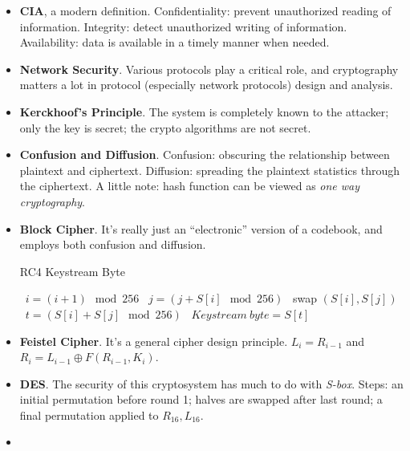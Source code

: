 \documentclass[twocolumn]{article}
\begin{document}
\begin{itemize}
\item \textbf{CIA}, a modern definition. Confidentiality: prevent
  unauthorized reading of information. Integrity: detect unauthorized
  writing of information. Availability: data is available in a timely
  manner when needed. 
\item \textbf{Network Security}. Various protocols play a critical
  role, and cryptography matters a lot in protocol (especially network
  protocols) design and analysis.
\item \textbf{Kerckhoof's Principle}. The system is completely known
  to the attacker; only the key is secret; the crypto algorithms are
  not secret. 
\item \textbf{Confusion and Diffusion}. Confusion: obscuring the
  relationship between plaintext and ciphertext. Diffusion: spreading
  the plaintext statistics through the ciphertext. A little note: hash
  function can be viewed as \emph{one way cryptography}.
\item \textbf{Block Cipher}. It's really just an ``electronic''
  version of a codebook, and employs both confusion and diffusion. 
  \begin{algorithm}
    \caption{RC4 Keystream Byte}
    \label{algo:rc4-keystream-byte}
    \begin{algorithmic}
      \STATE~$i=(i+1)\mod 256$
      \STATE~$j=(j+S[i]\mod 256)$
      \STATE~swap $(S[i], S[j])$
      \STATE~$t=(S[i]+S[j]\mod 256)$
      \STATE~$Keystream~ byte=S[t]$
    \end{algorithmic}
  \end{algorithm}
\item \textbf{Feistel Cipher}. It's a general cipher design
  principle. $L_{i}=R_{i-1}$ and $R_{i}=L_{i-1}\oplus
  F(R_{i-1},K_{i})$.
\item \textbf{DES}. The security of this cryptosystem has much to do
  with \emph{S-box}. Steps: an initial permutation before round 1;
  halves are swapped after last round; a final permutation applied to
  $R_{16},L_{16}$. 
\item 
\end{itemize}
\end{document}
